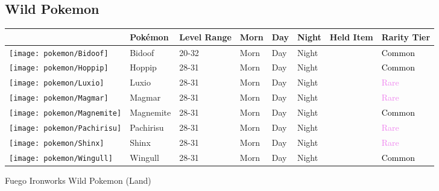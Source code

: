 \subsection{Wild Pokemon}%
\label{subsec:WildPokemon}%
\begin{longtable}{||l l l l l l l l||}%
\hline%
&Pokémon&Level Range&Morn&Day&Night&Held Item&Rarity Tier\\%
\hline%
\endhead%
\hline%
\texttt{[image: pokemon/Bidoof]}&Bidoof&20{-}32&Morn&Day&Night&&\textcolor{black}{%
Common%
}\\%
\hline%
\texttt{[image: pokemon/Hoppip]}&Hoppip&28{-}31&Morn&Day&Night&&\textcolor{black}{%
Common%
}\\%
\hline%
\texttt{[image: pokemon/Luxio]}&Luxio&28{-}31&Morn&Day&Night&&\textcolor{violet}{%
Rare%
}\\%
\hline%
\texttt{[image: pokemon/Magmar]}&Magmar&28{-}31&Morn&Day&Night&&\textcolor{violet}{%
Rare%
}\\%
\hline%
\texttt{[image: pokemon/Magnemite]}&Magnemite&28{-}31&Morn&Day&Night&&\textcolor{black}{%
Common%
}\\%
\hline%
\texttt{[image: pokemon/Pachirisu]}&Pachirisu&28{-}31&Morn&Day&Night&&\textcolor{violet}{%
Rare%
}\\%
\hline%
\texttt{[image: pokemon/Shinx]}&Shinx&28{-}31&Morn&Day&Night&&\textcolor{violet}{%
Rare%
}\\%
\hline%
\texttt{[image: pokemon/Wingull]}&Wingull&28{-}31&Morn&Day&Night&&\textcolor{black}{%
Common%
}\\%
\hline%
\end{longtable}%
\caption{Fuego Ironworks Wild Pokemon (Land)}%
